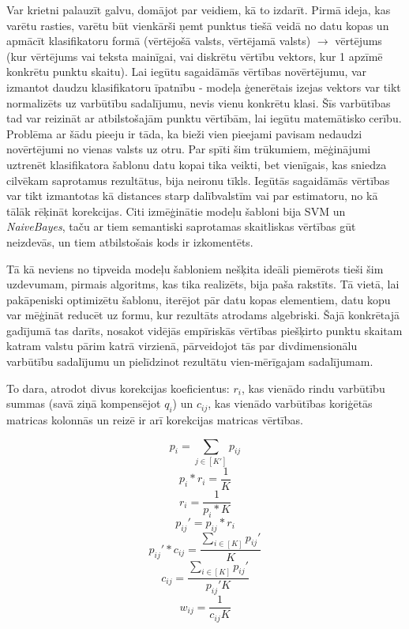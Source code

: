 \documentclass[12pt, a4paper]{article}
\begin{document}
Var krietni palauzīt galvu, domājot par veidiem, kā to izdarīt. Pirmā ideja, kas varētu rasties, varētu būt vienkārši ņemt punktus tiešā veidā no datu kopas un apmācīt klasifikatoru formā (vērtējošā valsts, vērtējamā valsts) $\rightarrow$ vērtējums (kur vērtējums vai teksta mainīgai, vai diskrētu vērtību vektors, kur 1 apzīmē konkrētu punktu skaitu). Lai iegūtu sagaidāmās vērtības novērtējumu, var izmantot daudzu klasifikatoru īpatnību - modeļa ģenerētais izejas vektors var tikt normalizēts uz varbūtību sadalījumu, nevis vienu konkrētu klasi. Šīs varbūtības tad var reizināt ar atbilstošajām punktu vērtībām, lai iegūtu matemātisko cerību. Problēma ar šādu pieeju ir tāda, ka bieži vien pieejami pavisam nedaudzi novērtējumi no vienas valsts uz otru. Par spīti šim trūkumiem, mēģinājumi uztrenēt klasifikatora šablonu datu kopai tika veikti, bet vienīgais, kas sniedza cilvēkam saprotamus rezultātus, bija neironu tīkls. Iegūtās sagaidāmās vērtības var tikt izmantotas kā distances starp dalībvalstīm vai par estimatoru, no kā tālāk rēķināt korekcijas. Citi izmēģinātie modeļu šabloni bija SVM un \textit{NaiveBayes}, taču ar tiem semantiski saprotamas skaitliskas vērtības gūt neizdevās, un tiem atbilstošais kods ir izkomentēts.

Tā kā neviens no tipveida modeļu šabloniem nešķita ideāli piemērots tieši šim uzdevumam, pirmais algoritms, kas tika realizēts, bija paša rakstīts. Tā vietā, lai pakāpeniski optimizētu šablonu, iterējot pār datu kopas elementiem, datu kopu var mēģināt reducēt uz formu, kur rezultāts atrodams algebriski. Šajā konkrētajā gadījumā tas darīts, nosakot vidējās empīriskās vērtības piešķirto punktu skaitam katram valstu pārim katrā virzienā, pārveidojot tās par divdimensionālu varbūtību sadalījumu un pielīdzinot rezultātu vien-mērīgajam sadalījumam. 

To dara, atrodot divus korekcijas koeficientus: $r_i$, kas vienādo rindu varbūtību summas (savā ziņā kompensējot $q_i$) un $c_{ij}$, kas vienādo varbūtības koriģētās matricas kolonnās un reizē ir arī korekcijas matricas vērtības. 

\begin{equation}
    p_i=\sum_{j\in [K']}p_{ij}
\end{equation}
\begin{equation}
    p_i*r_i=\frac{1}{K}
\end{equation}
\begin{equation}
    r_i = \frac{1}{p_i*K}
\end{equation}
\begin{equation}
    p_{ij}'=p_{ij}*r_i
\end{equation}
\begin{equation}
    p_{ij}'*c_{ij}=\frac{\sum_{i\in[K]}p_{ij}'}{K}
\end{equation}
\begin{equation}
    c_{ij}=\frac{\sum_{i\in[K]}p_{ij}'}{p_{ij}'K}
\end{equation}
\begin{equation}
    w_{ij}=\frac{1}{c_{ij}K}
\end{equation}
\end{document}
